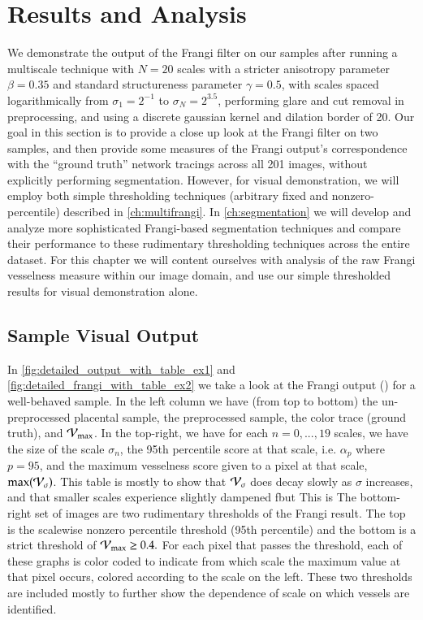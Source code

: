 \chapter{Results and Analysis} \label{ch:results-analysis}

We demonstrate the output of the Frangi filter on our samples after running a multiscale technique with $N=20$ scales with a stricter anisotropy parameter $\beta = 0.35$ and standard structureness parameter $\gamma=0.5$,
with scales spaced logarithmically from $\sigma_1 = 2^{-1}$ to $\sigma_N = 2^{3.5}$, performing glare and cut removal in preprocessing, and using a discrete gaussian kernel and dilation border of 20.
Our goal in this section is to provide a close up look at the Frangi filter on two samples, and then provide some measures of the Frangi output's correspondence with the ``ground truth'' network tracings across all 201 images, without explicitly performing segmentation. However, for visual demonstration, we will employ both simple thresholding techniques (arbitrary fixed and nonzero-percentile) described in \cref{ch:multifrangi}. In \cref{ch:segmentation} we will develop and analyze more sophisticated Frangi-based segmentation techniques and compare their performance to these rudimentary thresholding techniques across the entire dataset. For this chapter we will content ourselves with analysis of the raw Frangi vesselness measure within our image domain, and use our simple thresholded results for visual demonstration alone.

\section{Sample Visual Output}
In \cref{fig:detailed_output_with_table_ex1} and \cref{fig:detailed_frangi_with_table_ex2} we take a look at the Frangi output (\Vmax) for a well-behaved sample. In the left column we have (from top to bottom) the un-preprocessed placental sample, the preprocessed sample, the color trace (ground truth), and $\mathcal{V}_{\max}$. In the top-right, we have for each $n=0,...,19$ scales, we have the size of the scale $\sigma_n$, the 95th percentile score at that scale, i.e. $\alpha_p$ where $p=95$, and the maximum vesselness score given to a pixel at that scale, $\max(\mathcal{V}_{\sigma})$. This table is mostly to show that $\mathcal{V}_{\sigma}$ does decay slowly as $\sigma$ increases, and that smaller scales experience slightly dampened fbut  This is  The bottom-right set of images are two rudimentary thresholds of the Frangi result. The top is the scalewise nonzero percentile threshold (95th percentile) and the bottom is a strict threshold of $\mathcal{V}_{\max} \ge 0.4.$  For each pixel that passes the threshold, each of these graphs is color coded to indicate from which scale the maximum value at that pixel occurs, colored according to the scale on the left. These two thresholds are included mostly to further show the dependence of scale on which vessels are identified.

